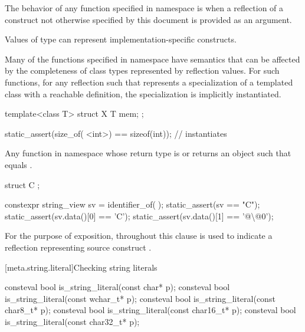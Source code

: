 \pnum
The behavior of any function specified in namespace  is
when a reflection of a construct not otherwise specified by this document
is provided as an argument.
\begin{note}
Values of type 
can represent implementation-specific constructs.
\end{note}
\begin{note}
Many of the functions specified in namespace 
have semantics that can be affected by
the completeness of class types represented by reflection values.
For such functions,
for any reflection  such that 
represents a specialization of a templated class with a reachable definition,
the specialization is implicitly instantiated.
\begin{example}
\begin{codeblock}
template<class T>
struct X {
  T mem;
};

static_assert(size_of(^^X<int>) == sizeof(int));    // instantiates 
\end{codeblock}
\end{example}
\end{note}

\pnum
Any function in namespace 
whose return type is  or 
returns an object  such that
 equals .
\begin{example}
\begin{codeblock}
struct C { };

constexpr string_view sv = identifier_of(^^C);
static_assert(sv == "C");
static_assert(sv.data()[0] == 'C');
static_assert(sv.data()[1] == '@\textbackslash{}@0');
\end{codeblock}
\end{example}

\pnum
For the purpose of exposition,
throughout this clause  is used
to indicate a reflection representing source construct .

[meta.string.literal]{Checking string literals}

%
\begin{itemdecl}
consteval bool is_string_literal(const char* p);
consteval bool is_string_literal(const wchar_t* p);
consteval bool is_string_literal(const char8_t* p);
consteval bool is_string_literal(const char16_t* p);
consteval bool is_string_literal(const char32_t* p);
\end{itemdecl}

